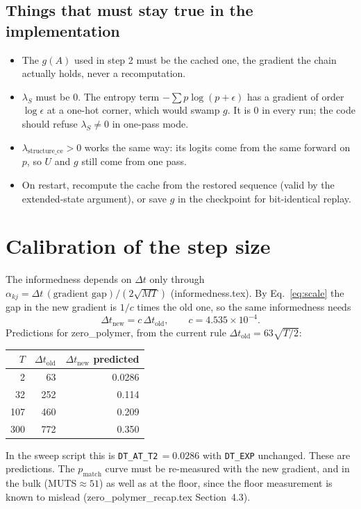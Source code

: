\documentclass[11pt,a4paper]{article}
\newcommand{\dt}{\Delta t}
\newcommand{\Mass}{M}
\begin{document}
\subsection{Things that must stay true in the implementation}
\begin{itemize}
  \item The $g(A)$ used in step 2 must be the cached one, the gradient the
        chain actually holds, never a recomputation.
  \item $\lambda_S$ must be 0. The entropy term $-\sum p\log(p+\epsilon)$ has a
        gradient of order $\log\epsilon$ at a one-hot corner, which would
        swamp $g$. It is 0 in every run; the code should refuse
        $\lambda_S\ne0$ in one-pass mode.
  \item $\lambda_{\mathrm{structure\_ce}}>0$ works the same way: its logits come
        from the same forward on $p$, so $U$ and $g$ still come from one pass.
  \item On restart, recompute the cache from the restored sequence (valid by
        the extended-state argument), or save $g$ in the checkpoint for
        bit-identical replay.
\end{itemize}

\section{Calibration of the step size}
The informedness depends on $\dt$ only through
$\alpha_{kj}=\dt\,(\text{gradient gap})/(2\sqrt{\Mass T})$ (informedness.tex).
By Eq.~\eqref{eq:scale} the gap in the new gradient is $1/c$ times the old one,
so the same informedness needs
\begin{equation}
  \dt_{\mathrm{new}} = c\,\dt_{\mathrm{old}},\qquad c = 4.535\times10^{-4}.
\end{equation}
Predictions for zero\_polymer, from the current rule
$\dt_{\mathrm{old}}=63\sqrt{T/2}$:
\begin{center}
\begin{tabular}{@{}rrr@{}}
\toprule
$T$ & $\dt_{\mathrm{old}}$ & $\dt_{\mathrm{new}}$ predicted \\
\midrule
2    & 63    & 0.0286 \\
32   & 252   & 0.114 \\
107  & 460   & 0.209 \\
300  & 772   & 0.350 \\
\bottomrule
\end{tabular}
\end{center}
In the sweep script this is \texttt{DT\_AT\_T2}$\,=0.0286$ with \texttt{DT\_EXP}
unchanged. These are predictions. The $p_{\mathrm{match}}$ curve must be
re-measured with the new gradient, and in the bulk (MUTS$\approx51$) as well as
at the floor, since the floor measurement is known to mislead
(zero\_polymer\_recap.tex Section~4.3).
\end{document}
